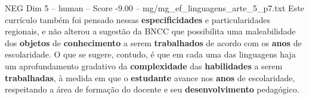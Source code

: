 \begin{textsample}{NEG Dim 5 – human – Score -9.00 – mg/mg\_ef\_linguagens\_arte\_5\_p7.txt}  \label{ex:f5_neg_017}
Este currículo também foi pensado nessas \textbf{especificidades} e particularidades regionais, e não alterou a sugestão da BNCC que possibilita uma maleabilidade dos \textbf{objetos} de \textbf{conhecimento} a serem \textbf{trabalhados} de acordo com os \textbf{anos} de escolaridade.
O que se sugere, contudo, é que em cada uma das linguagens haja um aprofundamento gradativo da \textbf{complexidade} das \textbf{habilidades} a serem \textbf{trabalhadas}, à medida em que o \textbf{estudante} avance nos \textbf{anos} de escolaridade, respeitando a área de formação do docente e seu \textbf{desenvolvimento} pedagógico.

\end{textsample}
